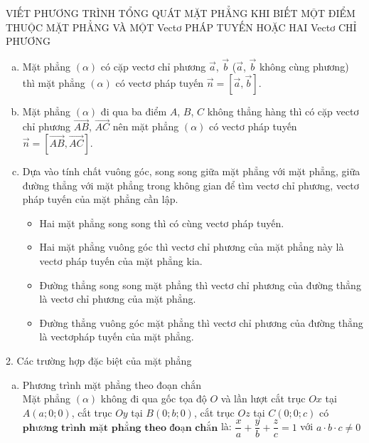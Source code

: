 \begin{dang}{VIẾT PHƯƠNG TRÌNH TỔNG QUÁT MẶT PHẲNG KHI BIẾT MỘT ĐIỂM THUỘC MẶT PHẲNG VÀ MỘT Vectơ PHÁP TUYẾN HOẶC HAI Vectơ CHỈ PHƯƠNG}
\begin{enumerate}[a.]
\item Mặt phẳng $\left(\alpha\right)$ có cặp vectơ chỉ phương $\overrightarrow{a}$, $\overrightarrow{b}$ ($\overrightarrow{a}$, $\overrightarrow{b}$ không cùng phương) thì mặt phẳng $\left(\alpha\right)$ có vectơ pháp tuyến $\overrightarrow{n}= \left[\overrightarrow{a},\overrightarrow{b}\right]$.
\item Mặt phẳng $\left(\alpha\right)$ đi qua ba điểm $A$, $B$, $C$ không thẳng hàng thì có cặp vectơ chỉ phương $\overrightarrow{AB}$, $\overrightarrow{AC}$ nên mặt phẳng $\left(\alpha\right)$ có vectơ pháp tuyến $\overrightarrow{n} = \left[\overrightarrow{AB}, \overrightarrow{AC}\right]$.
\item Dựa vào tính chất vuông góc, song song giữa mặt phẳng với mặt phẳng, giữa đường thẳng với mặt phẳng trong không gian để tìm vectơ chỉ phương, vectơ pháp tuyến của mặt phẳng cần lập.
\begin{itemize}
\item Hai mặt phẳng song song thì có cùng vectơ pháp tuyến.
\item Hai mặt phẳng vuông góc thì vectơ chỉ phương của mặt phẳng này là vectơ pháp tuyến của mặt phẳng kia.
\item Đường thẳng song song mặt phẳng thì vectơ chỉ phương của đường thẳng là vectơ chỉ phương của mặt phẳng.
\item Đường thẳng vuông góc mặt phẳng thì vectơ chỉ phương của đường thẳng là vectơpháp tuyến của mặt phẳng.
\end{itemize}
\end{enumerate}
2. Các trường hợp đặc biệt của mặt phẳng
\begin{enumerate}[a.]
\item Phương trình mặt phẳng theo đoạn chắn\\
Mặt phẳng $\left(\alpha\right)$ không đi qua gốc tọa độ $O$ và lần lượt cắt trục $Ox$ tại $A \left(a;0;0\right)$, cắt trục $Oy$ tại $B \left(0;b;0\right)$, cắt trục $Oz$ tại $C \left(0;0;c\right)$ có $\textbf{phương trình mặt phẳng theo đoạn chắn}$ là: $\dfrac{x}{a}+\dfrac{y}{b}+\dfrac{z}{c}=1$ với $a \cdot b \cdot c \neq 0$
\begin{center}
\end{center}
\end{enumerate}
\end{dang}
